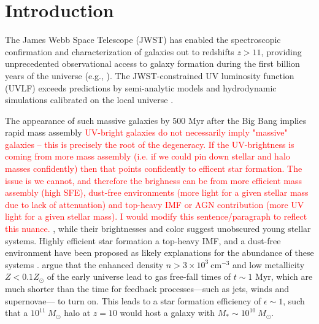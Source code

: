 \documentclass[twocolumn,linenumbers]{aastex631}
\begin{document}
\section{Introduction}
The James Webb Space Telescope (JWST) has enabled the spectroscopic confirmation and characterization of galaxies out to redshifts $z > 11$, providing unprecedented observational access to galaxy formation during the first billion years of the universe (e.g., \citealt{2023Natur.622..707A, 2023A&A...677A..88B, 2025A&A...697A..90B, 2026arXiv260111515D,2025arXiv251212813H}). The JWST-constrained UV luminosity function (UVLF) exceeds predictions by semi-analytic models and hydrodynamic simulations calibrated on the local universe \citep{2025arXiv251012411M, 2026arXiv260202322M,2025arXiv250804791F,2024MNRAS.531..997C, 2026MNRAS.546f2267C, 2025ApJ...995...43A, 2025A&A...698A.234D,2024ApJ...960...56H, 2025arXiv250804791F,2020ApJ...891..146R,2024A&A...691A..87M,2026arXiv260121833H}. 

The appearance of such massive galaxies by 500 Myr after the Big Bang implies rapid mass assembly \textcolor{red}{UV-bright galaxies do not necessarily imply "massive" galaxies -- this is precisely the root of the degeneracy. If the UV-brightness is coming from more mass assembly (i.e. if we could pin down stellar and halo masses confidently) then that points confidently to efficent star formation. The issue is we cannot, and therefore the brighness can be from more efficient mass assembly (high SFE), dust-free environments (more light for a given stellar mass due to lack of attenuation) and top-heavy IMF or AGN contribution (more UV light for a given stellar mass). I would modify this sentence/paragraph to reflect this nuance. }, while their brightnesses and color suggest unobscured young stellar systems. Highly efficient star formation a top-heavy IMF, and a dust-free environment have been proposed as likely explanations for the abundance of these systems \citep{2022ApJ...938L..10I,2023MNRAS.522.3986F,2023MNRAS.523.3201D,2023ApJ...955L..35S,2024A&A...684A.207F,2023MNRAS.520.2445Z}. \cite{2023MNRAS.523.3201D} argue that the enhanced density $n>3\times10^3\ \mathrm{cm^{-3}}$ and low metallicity $Z<0.1 Z_\odot$ of the early universe lead to gas free-fall times of $t \sim 1$ Myr, which are much shorter than the time for feedback processes---such as jets, winds and supernovae--- to turn on. This leads to a star formation efficiency of $\epsilon \sim 1$, such that a $10^{11}\ M_\odot$ halo at $z=10$ would host a galaxy with $M_*\sim 10^{10}\ M_\odot$.
\end{document}
